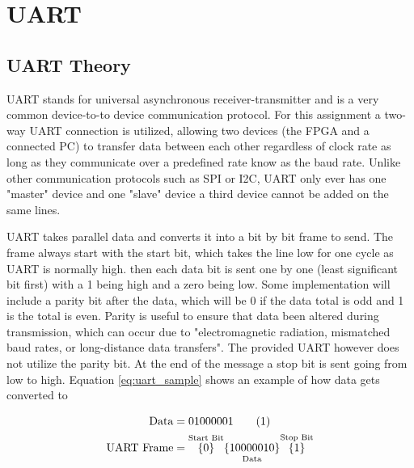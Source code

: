 \documentclass[11pt]{article}
\begin{document}
\section{UART}
\subsection{UART Theory}
UART stands for universal asynchronous receiver-transmitter and is a very common device-to-to device communication protocol\cite{UART}.
For this assignment a two-way UART connection is utilized,
allowing two devices (the FPGA and a connected PC) to transfer data between each other regardless of clock rate as long as they communicate over a predefined rate know as the baud rate.
Unlike other communication protocols such as SPI or I2C, UART only ever has one "master" device and one "slave" device a third device cannot be added on the same lines.

UART takes parallel data and converts it into a bit by bit frame to send.
The frame always start with the start bit, which takes the line low for one cycle as UART is normally high.
then each data bit is sent one by one (least significant bit first) with a 1 being high and a zero being low.
Some implementation will include a parity bit after the data, which will be 0 if the data total is odd and 1 is the total is even.
Parity is useful to ensure that data been altered during transmission, which can occur due to "electromagnetic radiation, mismatched baud rates, or long-distance data transfers"\cite{UART}.
The provided UART however does not utilize the parity bit.
At the end of the message a stop bit is sent going from low to high.
Equation \ref{eq:uart_sample} shows an example of how data gets converted to 

\begin{align*}
    \text{Data} &= 01000001
    \stepcounter{equation}\tag{\theequation}\label{eq:uart_sample} \\
    \text{UART Frame} &=    \overset{\text{Start Bit}}{\{0\}}
                            \underset{\text{Data}}{\{1000 0010\}}
                            \overset{\text{Stop Bit}}{\{1\}}\\
\end{align*}
\end{document}
